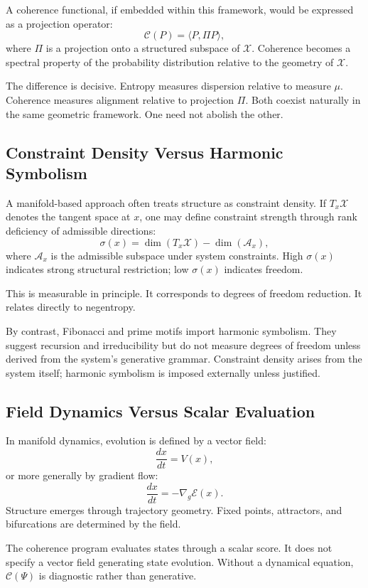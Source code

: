 \documentclass[12pt]{article}
\begin{document}
A coherence functional, if embedded within this framework, would be expressed as a projection operator:
\[
  \mathcal{C}(P) = \langle P, \Pi P \rangle,
\]
where $\Pi$ is a projection onto a structured subspace of $\mathcal{X}$. Coherence becomes a spectral property of the probability distribution relative to the geometry of $\mathcal{X}$.

The difference is decisive. Entropy measures dispersion relative to measure $\mu$. Coherence measures alignment relative to projection $\Pi$. Both coexist naturally in the same geometric framework. One need not abolish the other.

\subsection{Constraint Density Versus Harmonic Symbolism}

A manifold-based approach often treats structure as constraint density. If $T_x\mathcal{X}$ denotes the tangent space at $x$, one may define constraint strength through rank deficiency of admissible directions:
\[
  \sigma(x) = \dim(T_x\mathcal{X}) - \dim(\mathcal{A}_x),
\]
where $\mathcal{A}_x$ is the admissible subspace under system constraints. High $\sigma(x)$ indicates strong structural restriction; low $\sigma(x)$ indicates freedom.

This is measurable in principle. It corresponds to degrees of freedom reduction. It relates directly to negentropy.

By contrast, Fibonacci and prime motifs import harmonic symbolism. They suggest recursion and irreducibility but do not measure degrees of freedom unless derived from the system's generative grammar. Constraint density arises from the system itself; harmonic symbolism is imposed externally unless justified.

\subsection{Field Dynamics Versus Scalar Evaluation}

In manifold dynamics, evolution is defined by a vector field:
\[
  \frac{dx}{dt} = V(x),
\]
or more generally by gradient flow:
\[
  \frac{dx}{dt} = -\nabla_g \mathcal{E}(x).
\]
Structure emerges through trajectory geometry. Fixed points, attractors, and bifurcations are determined by the field.

The coherence program evaluates states through a scalar score. It does not specify a vector field generating state evolution. Without a dynamical equation, $\mathcal{C}(\Psi)$ is diagnostic rather than generative.
\end{document}
